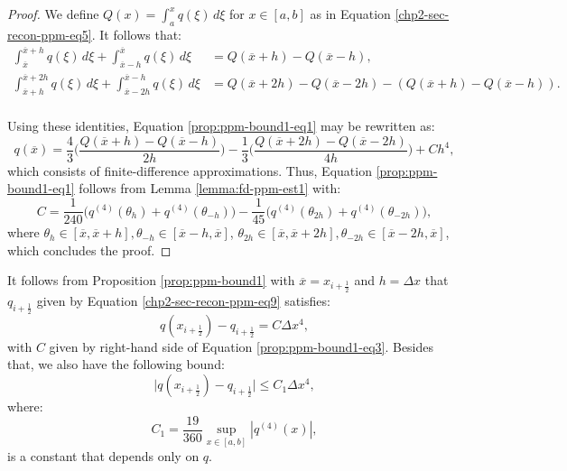 \begin{proof}
	We define $Q(x) = \int_{a}^{x} q(\xi) \,d\xi$ for $x \in [a,b]$ as in 
	Equation \eqref{chp2-sec-recon-ppm-eq5}. It follows that:
	\begin{align*}
		\int_{\overline{x}}^{\overline{x}+h} q(\xi) \,d\xi + \int_{\overline{x}-h}^{\overline{x}} q(\xi) \,d\xi &=
		Q(\overline{x}+h) - Q(\overline{x}-h), \\
		\int_{\overline{x}+h}^{\overline{x}+2h} q(\xi) \,d\xi + \int_{\overline{x}-2h}^{\overline{x}-h} q(\xi) \,d\xi &=
		Q(\overline{x}+2h) - Q(\overline{x}-2h) - (Q(\overline{x}+h) - Q(\overline{x}-h)). \\
	\end{align*}
	
	Using these identities, Equation \eqref{prop:ppm-bound1-eq1} may be rewritten as:
	\begin{equation}
		\label{prop:ppm-bound1-eq2}
		q(\overline{x}) = \frac{4}{3} \bigg(\frac{Q(\overline{x}+h) - Q(\overline{x}-h)}{2h}\bigg)
		       - \frac{1}{3} \bigg(\frac{Q(\overline{x}+2h) - Q(\overline{x}-2h)}{4h}\bigg)
+ Ch^4,
	\end{equation}
	which consists of finite-difference approximations. 
	Thus, Equation \eqref{prop:ppm-bound1-eq1} follows from Lemma \ref{lemma:fd-ppm-est1}
	with:
	\begin{equation}
		\label{prop:ppm-bound1-eq3}
		C = \frac{1}{240}\bigg( q^{(4)}(\theta_{h}) + q^{(4)}(\theta_{-h})\bigg)
		- \frac{1}{45}\bigg( q^{(4)}(\theta_{2h}) + q^{(4)}(\theta_{-2h})\bigg), 
	\end{equation}
	where $\theta_{h} \in [\overline{x},\overline{x}+h], \theta_{-h}\in [\overline{x}-h,\overline{x}]$, 
	$\theta_{2h} \in [\overline{x},\overline{x}+2h], \theta_{-2h}\in [\overline{x}-2h,\overline{x}]$,
	which concludes the proof.
\end{proof}

\begin{corollary}
	\label{prop:ppm-bound1-corollary}
	It follows from Proposition \ref{prop:ppm-bound1} with
	$\overline{x} = x_{i+\frac{1}{2}}$ and $h = \Delta x$
	that $q_{i+\frac{1}{2}}$ given by Equation \eqref{chp2-sec-recon-ppm-eq9} satisfies:
	\begin{equation}
		\label{ppm-edges-bound1}
		q{(x_{i+\frac{1}{2}})} - q_{i+\frac{1}{2}} = C\Delta x^4,
	\end{equation}
	with $C$ given by right-hand side of Equation \eqref{prop:ppm-bound1-eq3}.
	Besides that, we also have the following bound:
	\begin{equation}
		\label{ppm-edges-bound2}
		\big|q{(x_{i+\frac{1}{2}})} - q_{i+\frac{1}{2}}\big| \leq C_1\Delta x^4,
	\end{equation}
	where:
	\begin{equation}
		\label{ppm-cte-bound1}
		C_1 = \frac{19}{360}\sup_{x \in [a,b]}{|q^{(4)}(x)|},
	\end{equation}
	is a constant that depends only on $q$.
\end{corollary}


